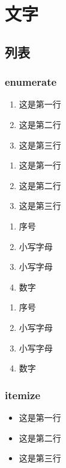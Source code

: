 \chapter{文字}

\section{列表}

\subsection{enumerate}

\begin{shellbox}
\begin{enumerate}
  \item 这是第一行
  \item 这是第二行
  \item 这是第三行
\end{enumerate}
\end{shellbox}

\begin{enumerate}
  \item 这是第一行
  \item 这是第二行
  \item 这是第三行
\end{enumerate}

\begin{shellbox}
\begin{enumerate}
  \item 序号
  \item [a.]小写字母
  \item [\dag]小写字母
  \item 数字
\end{enumerate}
\end{shellbox}

\begin{enumerate}
  \item 序号
  \item [a.]小写字母
  \item [\dag]小写字母
  \item 数字
\end{enumerate}

\subsection{itemize}

\begin{shellbox}
\begin{itemize}
  \item 这是第一行
  \item 这是第二行
  \item 这是第三行
\end{itemize}
\end{shellbox}

